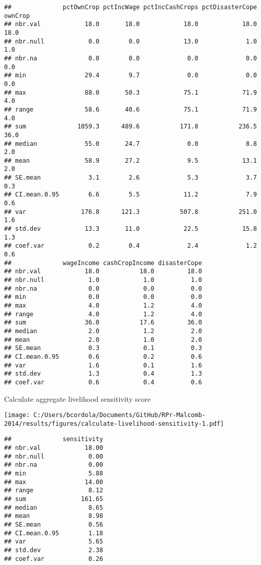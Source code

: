 \documentclass[
]{article}
\begin{document}
\begin{verbatim}
##              pctOwnCrop pctIncWage pctIncCashCrops pctDisasterCope ownCrop
## nbr.val            18.0       18.0            18.0            18.0    18.0
## nbr.null            0.0        0.0            13.0             1.0     1.0
## nbr.na              0.0        0.0             0.0             0.0     0.0
## min                29.4        9.7             0.0             0.0     0.0
## max                88.0       50.3            75.1            71.9     4.0
## range              58.6       40.6            75.1            71.9     4.0
## sum              1059.3      489.6           171.8           236.5    36.0
## median             55.0       24.7             0.0             8.8     2.0
## mean               58.9       27.2             9.5            13.1     2.0
## SE.mean             3.1        2.6             5.3             3.7     0.3
## CI.mean.0.95        6.6        5.5            11.2             7.9     0.6
## var               176.8      121.3           507.8           251.0     1.6
## std.dev            13.3       11.0            22.5            15.8     1.3
## coef.var            0.2        0.4             2.4             1.2     0.6
##              wageIncome cashCropIncome disasterCope
## nbr.val            18.0           18.0         18.0
## nbr.null            1.0            1.0          1.0
## nbr.na              0.0            0.0          0.0
## min                 0.0            0.0          0.0
## max                 4.0            1.2          4.0
## range               4.0            1.2          4.0
## sum                36.0           17.6         36.0
## median              2.0            1.2          2.0
## mean                2.0            1.0          2.0
## SE.mean             0.3            0.1          0.3
## CI.mean.0.95        0.6            0.2          0.6
## var                 1.6            0.1          1.6
## std.dev             1.3            0.4          1.3
## coef.var            0.6            0.4          0.6
\end{verbatim}

Calculate aggregate livelihood sensitivity score

\texttt{[image: C:/Users/bcordola/Documents/GitHub/RPr-Malcomb-2014/results/figures/calculate-livelihood-sensitivity-1.pdf]}

\begin{verbatim}
##              sensitivity
## nbr.val            18.00
## nbr.null            0.00
## nbr.na              0.00
## min                 5.88
## max                14.00
## range               8.12
## sum               161.65
## median              8.65
## mean                8.98
## SE.mean             0.56
## CI.mean.0.95        1.18
## var                 5.65
## std.dev             2.38
## coef.var            0.26
\end{verbatim}
\end{document}
